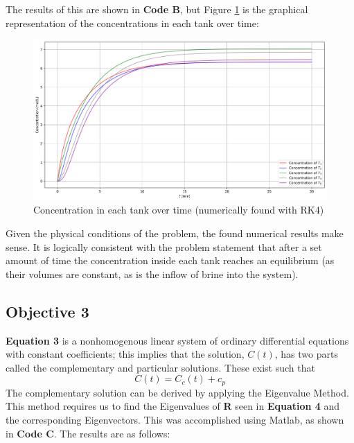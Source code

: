 \documentclass[a4paper, 12pt]{article}
\begin{document}
The results of this are shown in \textbf{Code B}, but Figure \ref{fig:numerical-sol} is the graphical representation of the concentrations in each tank over time:

\begin{figure}[H]
\centering
\includegraphics[width=.9\textwidth]{NumericalSol.png}
\caption{Concentration in each tank over time (numerically found with RK4)}
\label{fig:numerical-sol}
\end{figure}

Given the physical conditions of the problem, the found numerical results make sense. It is logically consistent with the problem statement that after a set amount of time the concentration inside each tank reaches an equilibrium (as their volumes are constant, as is the inflow of brine into the system). 

\subsection{Objective 3}
\textbf{Equation 3} is a nonhomogenous linear system of ordinary differential equations with constant coefficients; this implies that the solution, $C(t)$, has two parts called the complementary and particular solutions. These exist such that
\begin{equation}
C(t)=C_c(t)+c_p
\end{equation}
The complementary solution can be derived by applying the Eigenvalue Method. This method requires us to find the Eigenvalues of \textbf{R} seen in \textbf{Equation 4} and the corresponding Eigenvectors. This was accomplished using Matlab, as shown in \textbf{Code C}. The results are as follows:
\end{document}

